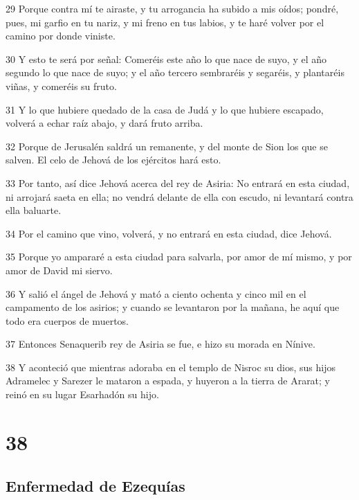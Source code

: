 \par 29 Porque contra mí te airaste, y tu arrogancia ha subido a mis oídos; pondré, pues, mi garfio en tu nariz, y mi freno en tus labios, y te haré volver por el camino por donde viniste.
\par 30 Y esto te será por señal: Comeréis este año lo que nace de suyo, y el año segundo lo que nace de suyo; y el año tercero sembraréis y segaréis, y plantaréis viñas, y comeréis su fruto.
\par 31 Y lo que hubiere quedado de la casa de Judá y lo que hubiere escapado, volverá a echar raíz abajo, y dará fruto arriba.
\par 32 Porque de Jerusalén saldrá un remanente, y del monte de Sion los que se salven. El celo de Jehová de los ejércitos hará esto.
\par 33 Por tanto, así dice Jehová acerca del rey de Asiria: No entrará en esta ciudad, ni arrojará saeta en ella; no vendrá delante de ella con escudo, ni levantará contra ella baluarte.
\par 34 Por el camino que vino, volverá, y no entrará en esta ciudad, dice Jehová.
\par 35 Porque yo ampararé a esta ciudad para salvarla, por amor de mí mismo, y por amor de David mi siervo.
\par 36 Y salió el ángel de Jehová y mató a ciento ochenta y cinco mil en el campamento de los asirios; y cuando se levantaron por la mañana, he aquí que todo era cuerpos de muertos.
\par 37 Entonces Senaquerib rey de Asiria se fue, e hizo su morada en Nínive.
\par 38 Y aconteció que mientras adoraba en el templo de Nisroc su dios, sus hijos Adramelec y Sarezer le mataron a espada, y huyeron a la tierra de Ararat; y reinó en su lugar Esarhadón su hijo. 

\chapter{38}

\section*{Enfermedad de Ezequías}

